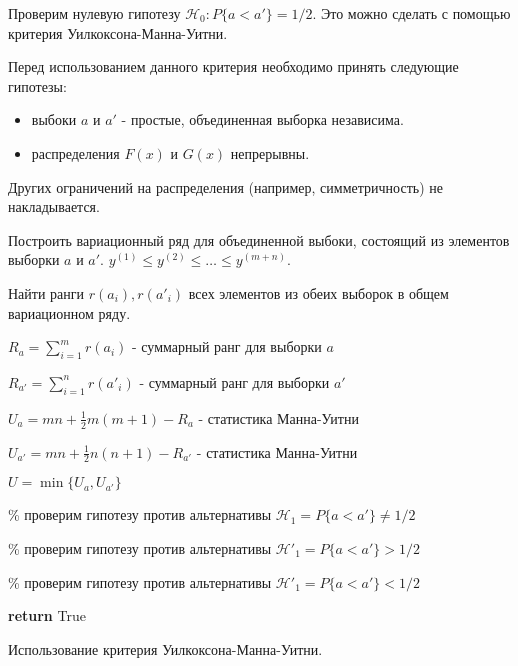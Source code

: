 \documentclass[12pt,a4paper]{report}
\begin{document}
Проверим нулевую гипотезу $\mathcal{H}_0: \textit{P}\{a < a'\} = 1/2$. Это можно сделать с помощью критерия Уилкоксона-Манна-Уитни.

Перед использованием данного критерия необходимо принять следующие гипотезы:
\begin{itemize}
\item выбоки $a$ и $a'$ - простые, объединенная выборка независима.
\item распределения $F(x)$ и $G(x)$ непрерывны.
\end{itemize}
Других ограничений на распределения (например, симметричность) не накладывается.

\begin{algorithm}[H]
\SetAlgoLined
{}

Построить вариационный ряд для объединенной выбоки, состоящий из элементов выборки  $a$ и $a'$. $y^{(1)} \le y^{(2)} \le \dots \le y^{(m + n)}$.

Найти ранги $r(a_i), r(a'_i)$ всех элементов из обеих выборок в общем вариационном ряду.

$R_{a} = \sum_{i=1}^{m}r(a_i)$ - суммарный ранг для выборки $a$

$R_{a'} = \sum_{i=1}^{n}r(a'_i)$ - суммарный ранг для выборки $a'$

$U_{a} = mn + \frac{1}{2}m(m+1) - R_{a}$ - статистика Манна-Уитни

$U_{a'} = mn + \frac{1}{2}n(n+1) - R_{a'}$ - статистика Манна-Уитни

$U = \min\{U_{a}, U_{a'}\}$

\% проверим гипотезу против альтернативы $\mathcal{H}_1 = \textit{P}\{a < a'\} \neq 1/2$


\% проверим гипотезу против альтернативы $\mathcal{H}'_1 = \textit{P}\{a < a'\} > 1/2$


\% проверим гипотезу против альтернативы $\mathcal{H}'_1 = \textit{P}\{a < a'\} < 1/2$

\textbf{return} True
\caption{Использование критерия Уилкоксона-Манна-Уитни.}
\label{alg:MWW}
\end{algorithm}
\end{document}

